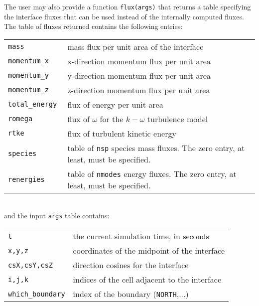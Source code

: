 \medskip
The user may also provide a function \texttt{flux(args)} that returns a table specifying the interface fluxes
that can be used instead of the internally computed fluxes.
The table of fluxes returned contains the following entries:\\
\begin{tabular}{ll}
 \texttt{mass} &  mass flux per unit area of the interface \\
 \texttt{momentum\_x} & x-direction momentum flux per unit area \\
 \texttt{momentum\_y} & y-direction momentum flux per unit area \\
 \texttt{momentum\_z} & z-direction momentum flux per unit area \\
 \texttt{total\_energy } & flux of energy per unit area \\
 \texttt{romega} & flux of $\omega$ for the $k-\omega$ turbulence model \\
 \texttt{rtke} & flux of turbulent kinetic energy \\
 \texttt{species} & \parbox{12cm}{table of \texttt{nsp} species mass fluxes. The zero entry, at least, must be specified.} \\
 \texttt{renergies} & \parbox{12cm}{table of \texttt{nmodes} energy fluxes. The zero entry, at least, must be specified.} \\
\end{tabular}\\
and the input \texttt{args} table contains:\\
\begin{tabular}{ll}
 \texttt{t} &  the current simulation time, in seconds \\
 \texttt{x,y,z} &  coordinates of the midpoint of the interface\\
 \texttt{csX,csY,csZ} &  direction cosines for the interface\\
 \texttt{i,j,k} &  indices of the cell adjacent to the interface\\
 \texttt{which\_boundary} & index of the boundary (\texttt{NORTH},...) \\
\end{tabular}


